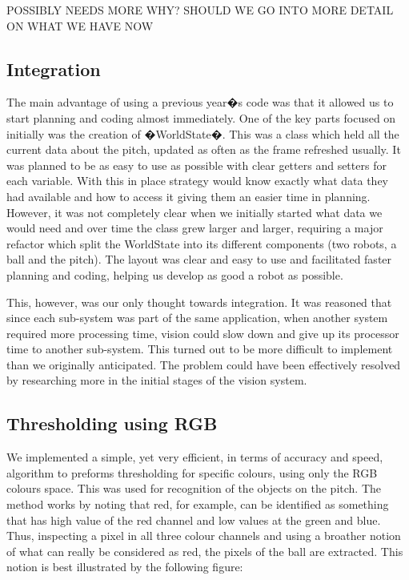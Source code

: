 POSSIBLY NEEDS MORE WHY?  SHOULD WE GO INTO MORE DETAIL ON WHAT WE HAVE NOW

\subsection{Integration}

The main advantage of using a previous year�s code was that it allowed us to start planning and coding almost immediately. One of the key parts focused on initially was the creation of �WorldState�. This was a class which held all the current data about the pitch, updated as often as the frame refreshed usually. It was planned to be as easy to use as possible with clear getters and setters for each variable. With this in place strategy would know exactly what data they had available and how to access it giving them an easier time in planning. However, it was not completely clear when we initially started what data we would need and over time the class grew larger and larger, requiring a major refactor which split the WorldState into its different components (two robots, a ball and the pitch). The layout was clear and easy to use and facilitated faster planning and coding, helping us develop as good a robot as possible.

This, however, was our only thought towards integration. It was reasoned that since each sub-system was part of the same application, when another system required more processing time, vision could slow down and give up its processor time to another sub-system. This turned out to be more difficult to implement than we originally anticipated. The problem could have been effectively resolved by researching more in the initial stages of the vision system.

\subsection{Thresholding using RGB}

We implemented a simple, yet very efficient, in terms of accuracy and speed, algorithm to preforms thresholding for specific colours, using only the RGB colours space. This was used for recognition of the objects on the pitch. The method works by noting that red, for example, can be identified as something that has high value of the red channel and low values at the green and blue.  Thus, inspecting a pixel in all three colour channels and using a broather notion of what can really be considered as red, the pixels of the ball are extracted. This notion is best illustrated by the following figure: 

